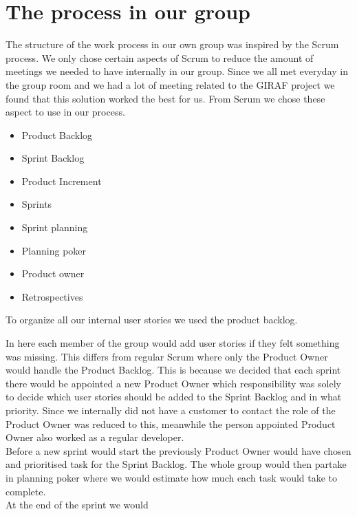 \section{The process in our group}

The structure of the work process in our own group was inspired by the Scrum process.
We only chose certain aspects of Scrum to reduce the amount of meetings we needed to have internally in our group. 
Since we all met everyday in the group room and we had a lot of meeting related to the GIRAF project we found that this solution worked the best for us.
From Scrum we chose these aspect to use in our process.

 \begin{itemize}
    \item Product Backlog
    \item Sprint Backlog
    \item Product Increment
    \item Sprints
    \item Sprint planning
    \item Planning poker
    \item Product owner
    \item Retrospectives
 \end{itemize}

 To organize all our internal user stories we used the product backlog.
 
 In here each member of the group would add user stories if they felt something was missing.
 This differs from regular Scrum where only the Product Owner would handle the Product Backlog.
 This is because we decided that each sprint there would be appointed a new Product Owner which responsibility was solely to decide which user stories should be added to the Sprint Backlog and in what priority.
 Since we internally did not have a customer to contact the role of the Product Owner was reduced to this, meanwhile the person appointed Product Owner also worked as a regular developer.
 \\
 Before a new sprint would start the previously Product Owner would have chosen and prioritised task for the Sprint Backlog.
 The whole group would then partake in planning poker where we would estimate how much each task would take to complete.
 \\
 At the end of the sprint we would 

